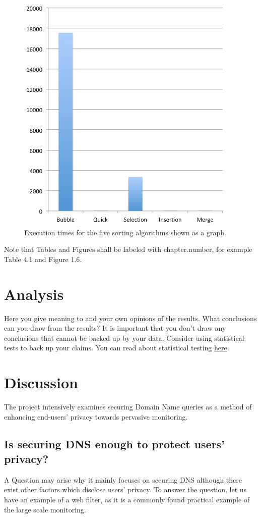 \documentclass[a4paper,12pt]{article}
\begin{document}
\begin{figure}[ht!]
\begin{center}
\includegraphics*[width=0.6\columnwidth]{img/graph}
\end{center}
\caption{Execution times for the five sorting algorithms shown as a graph.}
\label{graph}
\end{figure}

Note that Tables and Figures shall be labeled with chapter.number, for example Table 4.1 and Figure 1.6.

\newpage
	
\section{Analysis}
Here you give meaning to and your own opinions of the results. What conclusions can you draw from the results? It is important that you don't draw any conclusions that cannot be backed up by your data. Consider using statistical tests to back up your claims. You can read about statistical testing \href{https://coursepress.lnu.se/subject/thesis-projects/statistical-testing/}{here}. 
	
\newpage
	
\section{Discussion}
The project intensively examines securing Domain Name queries as a method of enhancing end-users' privacy towards pervasive monitoring.
\subsection{Is securing DNS enough to protect users' privacy?}
A Question may arise why it mainly focuses on securing DNS although there exist other factors which disclose users' privacy.
To answer the question, let us have an example of a web filter, as it is a commonly found practical example of the large scale monitoring\cite{murdoch2008tools}.
\end{document}
